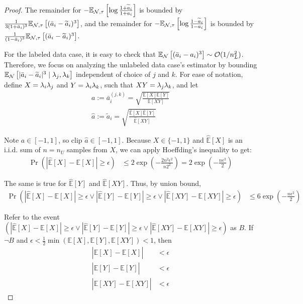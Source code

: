 \begin{proof}
The remainder for $-\mathbb{E}_{\mathcal{N}, \tau}\left[\log \frac{1 + \widetilde{a}_i}{1 + a_i}\right]$ is bounded by $\frac{1}{3(1 + \bar{a}_i)^3}\mathbb{E}_{\mathcal{N}, \tau}\left[(\bar{a}_i - \widetilde{a}_i)^3\right]$, and the remainder for $-\mathbb{E}_{\mathcal{N}, \tau}\left[\log \frac{1 - \widetilde{a}_i}{1 - a_i}\right]$ is bounded by $\frac{1}{(1 - \bar{a}_i)^3} \mathbb{E}_{\mathcal{N}, \tau}\left[(\bar{a}_i - \widetilde{a}_i)^3\right]$.

For the labeled data case, it is easy to check that $\mathbb{E}_{\mathcal{N}}\left[(\bar{a}_i - a_i)^3\right] \sim \mathcal{O}(1/n_L^2)$. Therefore, we focus on analyzing the unlabeled data case's estimator by bounding $\mathbb{E}_{\mathcal{N}}\left[|\bar{a}_i - \widetilde{a}_i|^3 \; | \; \lambda_j, \lambda_k\right]$ independent of choice of $j$ and $k$. For ease of notation, define $X =\lambda_i \lambda_j$ and $Y = \lambda_i \lambda_k$, such that $XY = \lambda_j \lambda_k$, and let 
\begin{align}
    a := \bar{a}_i^{(j, k)} = \sqrt{  \frac{\mathbb{E}[X] \mathbb{E}[Y]}{\mathbb{E}[XY]}   } \\
    \hat{a} := \widetilde{a}_i = \sqrt{  \frac{\hat{\mathbb{E}}[X] \hat{\mathbb{E}}[Y]}{\hat{\mathbb{E}}[XY]}   }
\end{align}

Note $a \in [-1,1]$, so clip $\hat{a} \in [-1,1]$. Because $X \in \{-1,1\}$ and $\hat{\mathbb{E}}[X]$ is an i.i.d. sum of $n = n_U$ samples from $X$, we can apply Hoeffding's inequality to get:
\begin{align}
    \Pr \left( |\hat{\mathbb{E}}[X] - \mathbb{E}[X]| \geq \epsilon \right) &\leq 2 \exp \left( - \frac{2 n^2 \epsilon^2}{n 2^2}   \right) = 2 \exp \left( - \frac{n \epsilon^2}{2} \right)
\end{align}

The same is true for $\hat{\mathbb{E}}[Y]$ and $\hat{\mathbb{E}}[XY]$. Thus, by union bound,
\begin{align}
    \Pr \left( |\hat{\mathbb{E}}[X] - \mathbb{E}[X]| \geq \epsilon \vee |\hat{\mathbb{E}}[Y] - \mathbb{E}[Y]| \geq \epsilon \vee |\hat{\mathbb{E}}[XY] - \mathbb{E}[XY]| \geq \epsilon \right) &\leq 6 \exp \left( - \frac{n \epsilon^2}{2} \right)
\end{align}

Refer to the event $\left( |\hat{\mathbb{E}}[X] - \mathbb{E}[X]| \geq \epsilon \vee |\hat{\mathbb{E}}[Y] - \mathbb{E}[Y]| \geq \epsilon \vee |\hat{\mathbb{E}}[XY] - \mathbb{E}[XY]| \geq \epsilon \right)$ as $B$. If $\neg B$ and $\epsilon< \frac{1}{2} \min(\mathbb{E}[X], \mathbb{E}[Y], \mathbb{E}[XY]) < 1$, then
\begin{align}
    |\hat{\mathbb{E}}[X] - \mathbb{E}[X]| &< \epsilon \\
    |\hat{\mathbb{E}}[Y] - \mathbb{E}[Y]| &< \epsilon \\
    |\hat{\mathbb{E}}[XY] - \mathbb{E}[XY]| &< \epsilon
\end{align}


\end{proof}
